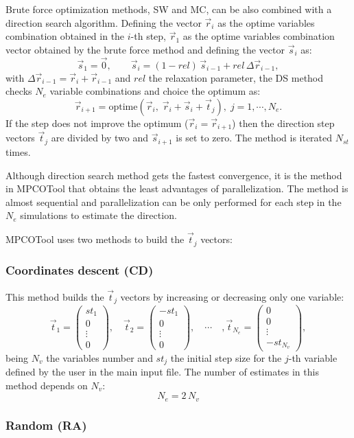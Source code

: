 \documentclass[review,authoryear]{elsarticle}
\newcommand{\EQ}[2]
{\begin{equation}#1\label{#2}\end{equation}}
\newcommand{\MATRIX}[2]{\PA{\begin{array}{#1}#2\end{array}}}
\newcommand{\PA}[1]{\left(#1\right)}
\begin{document}
Brute force optimization methods, SW and MC, can be also combined
with a direction search algorithm. Defining the vector $\vec{r}_i$ as the optime
variables combination obtained in the $i$-th step, $\vec{r}_1$ as the optime
variables combination vector obtained by the brute force method and defining
the vector $\vec{s}_i$ as:
\EQ
{
	\vec{s}_1=\vec{0},\qquad
	\vec{s}_i=(1-rel)\,\vec{s}_{i-1}+rel\,\Delta\vec{r}_{i-1},
}{Eqs}
with $\Delta\vec{r}_{i-1}=\vec{r}_i+\vec{r}_{i-1}$ and $rel$ the
relaxation parameter, the DS method checks $N_e$
variable combinations and choice the optimum as:
\EQ
{
	\vec{r}_{i+1}=\mathrm{optime}\PA{\vec{r}_i,\;\vec{r}_i+\vec{s}_i+\vec{t}_j},
	\;j=1,\cdots,N_e.
}{EqDirection}
If the step does not improve the optimum ($\vec{r}_i=\vec{r}_{i+1}$) then the
direction step vectors $\vec{t}_j$ are divided by two and $\vec{s}_{i+1}$ is set
to zero. The method is iterated $N_{st}$ times.

Although direction search method gets the fastest convergence, it is the method
in MPCOTool that obtains the least advantages of parallelization. The method is
almost sequential and parallelization can be only performed for each step in the
$N_e$ simulations to estimate the direction.

MPCOTool uses two methods to build the $\vec{t}_j$ vectors:

\subsubsection{Coordinates descent (CD)}

This method builds the $\vec{t}_j$ vectors by increasing or decreasing only one
variable:
\EQ
{
	\vec{t}_1=\MATRIX{c}{st_1\\0\\\vdots\\0},\quad
	\vec{t}_2=\MATRIX{c}{-st_1\\0\\\vdots\\0},\quad
	\cdots\quad,\vec{t}_{N_e}=\MATRIX{c}{0\\0\\\vdots\\-st_{N_v}},
}{EqtDescent}
being $N_v$ the variables number and $st_j$ the initial step size for the $j$-th
variable defined by the user in the main input file. The number of estimates in
this method depends on $N_v$:
\EQ{N_e=2\,N_v}{EqNestimatesDescent}

\subsubsection{Random (RA)}
\end{document}
